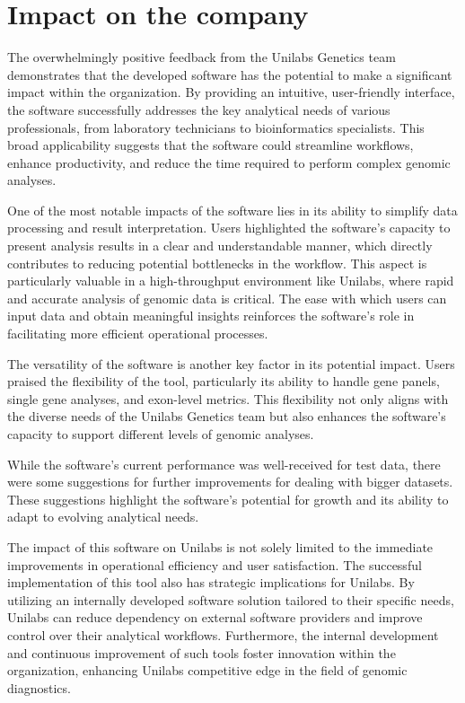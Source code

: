 \section{Impact on the company}

The overwhelmingly positive feedback from the Unilabs Genetics team demonstrates that the developed software has the potential to make a significant impact within the organization. By providing an intuitive, user-friendly interface, the software successfully addresses the key analytical needs of various professionals, from laboratory technicians to bioinformatics specialists. This broad applicability suggests that the software could streamline workflows, enhance productivity, and reduce the time required to perform complex genomic analyses.

One of the most notable impacts of the software lies in its ability to simplify data processing and result interpretation. Users highlighted the software's capacity to present analysis results in a clear and understandable manner, which directly contributes to reducing potential bottlenecks in the workflow. This aspect is particularly valuable in a high-throughput environment like Unilabs, where rapid and accurate analysis of genomic data is critical. The ease with which users can input data and obtain meaningful insights reinforces the software's role in facilitating more efficient operational processes.

The versatility of the software is another key factor in its potential impact. Users praised the flexibility of the tool, particularly its ability to handle gene panels, single gene analyses, and exon-level metrics. This flexibility not only aligns with the diverse needs of the Unilabs Genetics team but also enhances the software's capacity to support different levels of genomic analyses.

While the software's current performance was well-received for test data, there were some suggestions for further improvements for dealing with bigger datasets. These suggestions highlight the software's potential for growth and its ability to adapt to evolving analytical needs.

The impact of this software on Unilabs is not solely limited to the immediate improvements in operational efficiency and user satisfaction. The successful implementation of this tool also has strategic implications for Unilabs. By utilizing an internally developed software solution tailored to their specific needs, Unilabs can reduce dependency on external software providers and improve control over their analytical workflows. Furthermore, the internal development and continuous improvement of such tools foster innovation within the organization, enhancing Unilabs competitive edge in the field of genomic diagnostics.

